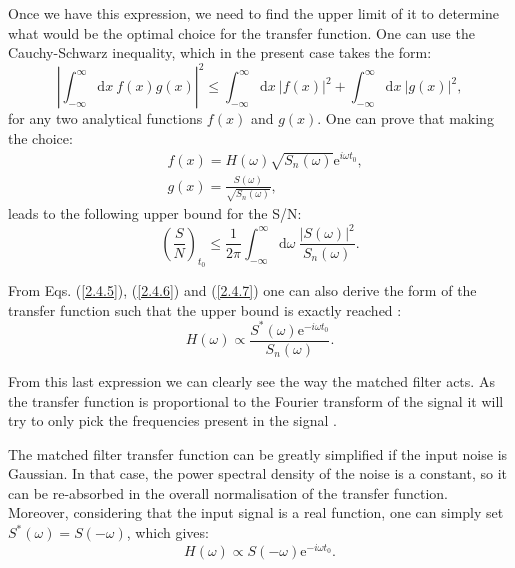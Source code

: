 Once we have this expression, we need to find the upper limit of it to determine what would be the optimal choice for the transfer function. One can use the Cauchy-Schwarz inequality, which in the present case takes the form:
\begin{equation}\label{2.4.6}
	\left|\int_{-\infty}^{\infty} \mathrm{d}x \ f(x) g(x)\right|^{2} \leq \int_{-\infty}^{\infty} \mathrm{d}x \ \left|f(x)\right|^{2} + \int_{-\infty}^{\infty} \mathrm{d}x \ \left|g(x)\right|^{2},
\end{equation}
for any two analytical functions $f(x)$ and $g(x)$. One can prove that making the choice:
\begin{equation}\label{2.4.7}
	\begin{split}
		&f(x) = H(\omega) \sqrt{S_{n}(\omega)}\mathrm{e}^{i \omega t_{0}},\\
		&g(x) = \frac{S(\omega)}{\sqrt{S_{n}(\omega)}},
	\end{split}
\end{equation}
leads to the following upper bound for the S/N:
\begin{equation}\label{2.4.8}
	\left(\frac{S}{N}\right)_{t_{0}} \leq \frac{1}{2\pi}\int_{-\infty}^{\infty} \mathrm{d}\omega \  \frac{\left|S(\omega)\right|^{2}}{S_{n}(\omega)}.
\end{equation}

From Eqs. (\ref{2.4.5}), (\ref{2.4.6}) and (\ref{2.4.7}) one can also derive the form of the transfer function such that the upper bound is exactly reached \cite{Dwork1950}:
\begin{equation}\label{2.4.9}
	H(\omega) \propto \frac{S^{*}(\omega) \mathrm{e}^{-i \omega t_{0}}}{S_{n}(\omega)}.
\end{equation}

From this last expression we can clearly see the way the matched filter acts. As the transfer function is proportional to the Fourier transform of the signal it will try to only pick the frequencies present in the signal \cite{Wainstein1962}.

The matched filter transfer function can be greatly simplified if the input noise is Gaussian. In that case, the power spectral density of the noise is a constant, so it can be re-absorbed in the overall normalisation of the transfer function. Moreover, considering that the input signal is a real function, one can simply set $S^{*}(\omega) = S(-\omega)$, which gives:
\begin{equation}\label{2.4.10}
	H(\omega) \propto S(-\omega) \mathrm{e}^{-i \omega t_{0}}.
\end{equation}

